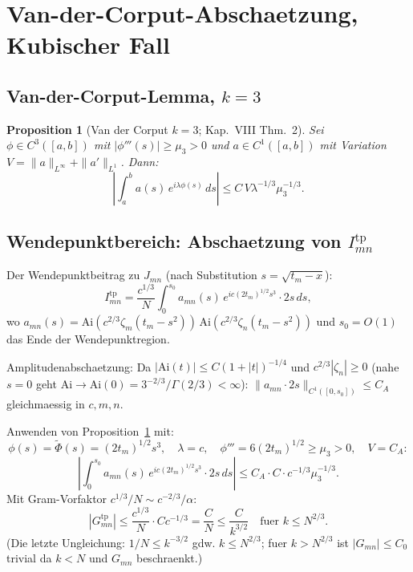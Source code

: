 \documentclass[12pt,a4paper]{amsart}
\newtheorem{proposition}[theorem]{Proposition}
\theoremstyle{definition}
\newcommand{\Ai}{\mathrm{Ai}}
\newcommand{\zn}{\zeta_n}
\newcommand{\zm}{\zeta_m}
\newcommand{\tm}{t_m}
\newcommand{\abs}[1]{\left|#1\right|}
\newcommand{\norm}[1]{\|#1\|}
\begin{document}
\section{Van-der-Corput-Abschaetzung, Kubischer Fall}
\label{sec:vdc}

\subsection{Van-der-Corput-Lemma, $k=3$}

\begin{proposition}[Van der Corput $k=3$; \cite{Stein1993} Kap.~VIII Thm.~2]\label{prop:vdc3}
Sei $\phi \in C^3([a,b])$ mit $\abs{\phi'''(s)} \ge \mu_3 > 0$
und $a \in C^1([a,b])$ mit Variation $V = \norm{a}_{L^\infty} + \norm{a'}_{L^1}$.
Dann:
\begin{equation}\label{eq:vdc3}
  \abs{\int_a^b a(s)\,e^{i\lambda\phi(s)}\,ds}
  \le C\, V \lambda^{-1/3} \mu_3^{-1/3}.
\end{equation}
\end{proposition}

\subsection{Wendepunktbereich: Abschaetzung von $I_{mn}^{\mathrm{tp}}$}

Der Wendepunktbeitrag zu $J_{mn}$ (nach Substitution $s = \sqrt{\tm - x}$):
\begin{equation}\label{eq:Itp}
  I_{mn}^{\mathrm{tp}}
  = \frac{c^{1/3}}{N}\int_0^{s_0}
      a_{mn}(s)\,e^{ic(2\tm)^{1/2}s^3}\cdot 2s\,ds,
\end{equation}
wo $a_{mn}(s) = \Ai(c^{2/3}\zm(\tm-s^2))\,\Ai(c^{2/3}\zn(\tm-s^2))$
und $s_0 = O(1)$ das Ende der Wendepunktregion.

Amplitudenabschaetzung: Da $|\Ai(t)| \le C(1+|t|)^{-1/4}$ und
$c^{2/3}|\zn| \ge 0$ (nahe $s=0$ geht $\Ai \to \Ai(0) = 3^{-2/3}/\Gamma(2/3) < \infty$):
$\norm{a_{mn}\cdot 2s}_{C^1([0,s_0])} \le C_A$ gleichmaessig in $c, m, n$.

Anwenden von Proposition~\ref{prop:vdc3} mit:
\[
  \phi(s) = \tilde{\Phi}(s) = (2\tm)^{1/2}s^3,\quad
  \lambda = c,\quad
  \phi''' = 6(2\tm)^{1/2} \ge \mu_3 > 0,\quad
  V = C_A:
\]
\begin{equation}\label{eq:Itp_bound}
  \abs{\int_0^{s_0}a_{mn}(s)\,e^{ic(2\tm)^{1/2}s^3}\cdot 2s\,ds}
  \le C_A\cdot C\cdot c^{-1/3}\mu_3^{-1/3}.
\end{equation}
Mit Gram-Vorfaktor $c^{1/3}/N \sim c^{-2/3}/\alpha$:
\begin{equation}\label{eq:Gmn_tp}
  \abs{G_{mn}^{\mathrm{tp}}}
  \le \frac{c^{1/3}}{N}\cdot C c^{-1/3}
  = \frac{C}{N} \le \frac{C}{k^{3/2}}
  \quad \text{fuer } k \le N^{2/3}.
\end{equation}
(Die letzte Ungleichung: $1/N \le k^{-3/2}$ gdw. $k \le N^{2/3}$;
fuer $k > N^{2/3}$ ist $|G_{mn}| \le C_0$ trivial da $k < N$ und $G_{mn}$ beschraenkt.)
\end{document}
